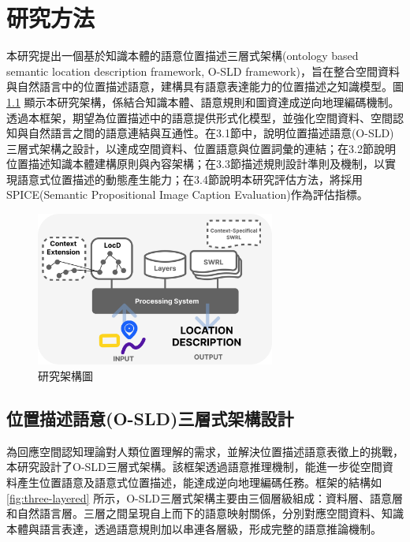
\chapter{研究方法}

本研究提出一個基於知識本體的語意位置描述三層式架構(ontology based semantic location description framework, O-SLD framework)，旨在整合空間資料與自然語言中的位置描述語意，建構具有語意表達能力的位置描述之知識模型。圖 \ref{fig:framework} 顯示本研究架構，係結合知識本體、語意規則和圖資達成逆向地理編碼機制。透過本框架，期望為位置描述中的語意提供形式化模型，並強化空間資料、空間認知與自然語言之間的語意連結與互通性。在3.1節中，說明位置描述語意(O-SLD)三層式架構之設計，以達成空間資料、位置語意與位置詞彙的連結；在3.2節說明位置描述知識本體建構原則與內容架構；在3.3節描述規則設計準則及機制，以實現語意式位置描述的動態產生能力；在3.4節說明本研究評估方法，將採用SPICE(Semantic Propositional Image Caption Evaluation)作為評估指標。

\begin{figure}[!htbp]
\centering
\includegraphics[width = 0.7\textwidth]{figures/research_framework.png}
\caption{研究架構圖}
\label{fig:framework}
\end{figure}

\section{位置描述語意(O-SLD)三層式架構設計}

為回應空間認知理論對人類位置理解的需求，並解決位置描述語意表徵上的挑戰，本研究設計了O-SLD三層式架構。該框架透過語意推理機制，能進一步從空間資料產生位置語意及語意式位置描述，能達成逆向地理編碼任務。框架的結構如 \ref{fig:three-layered} 所示，O-SLD三層式架構主要由三個層級組成：資料層、語意層和自然語言層。三層之間呈現自上而下的語意映射關係，分別對應空間資料、知識本體與語言表達，透過語意規則加以串連各層級，形成完整的語意推論機制。


